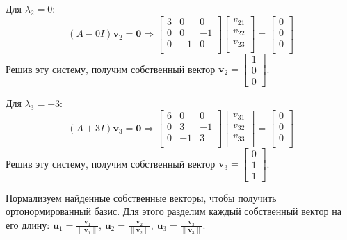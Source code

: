 \documentclass{article}
\begin{document}
   Для \(\lambda_2 = 0\):
   \[
   (A - 0I) \mathbf{v}_2 = \mathbf{0} \Rightarrow
   \begin{bmatrix}
   3 & 0 & 0 \\
   0 & 0 & -1 \\
   0 & -1 & 0 \\
   \end{bmatrix}
   \begin{bmatrix}
   v_{21} \\
   v_{22} \\
   v_{23} \\
   \end{bmatrix}
   =
   \begin{bmatrix}
   0 \\
   0 \\
   0 \\
   \end{bmatrix}
   \]
   Решив эту систему, получим собственный вектор \(\mathbf{v}_2 = \begin{bmatrix} 1 \\ 0 \\ 0 \end{bmatrix}\).

   Для \(\lambda_3 = -3\):
   \[
   (A + 3I) \mathbf{v}_3 = \mathbf{0} \Rightarrow
   \begin{bmatrix}
   6 & 0 & 0 \\
   0 & 3 & -1 \\
   0 & -1 & 3 \\
   \end{bmatrix}
   \begin{bmatrix}
   v_{31} \\
   v_{32} \\
   v_{33} \\
   \end{bmatrix}
   =
   \begin{bmatrix}
   0 \\
   0 \\
   0 \\
   \end{bmatrix}
   \]
   Решив эту систему, получим собственный вектор \(\mathbf{v}_3 = \begin{bmatrix} 0 \\ 1 \\ 1 \end{bmatrix}\).

Нормализуем найденные собственные векторы, чтобы получить ортонормированный базис. Для этого разделим каждый собственный вектор на его длину:
   \(\mathbf{u}_1 = \frac{\mathbf{v}_1}{\|\mathbf{v}_1\|}\),
   \(\mathbf{u}_2 = \frac{\mathbf{v}_2}{\|\mathbf{v}_2\|}\),
   \(\mathbf{u}_3 = \frac{\mathbf{v}_3}{\|\mathbf{v}_3\|}\).
   
\end{document}
